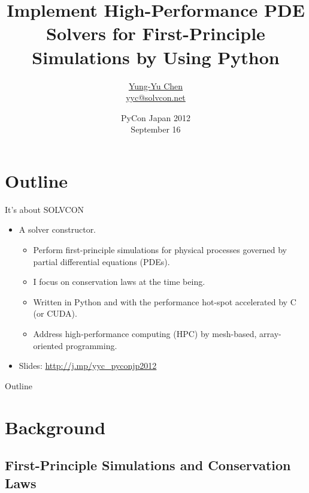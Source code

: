 \documentclass[dvips,xcolor=pst,14pt]{beamer}
\title[SOLVCON: HPC PDE Solvers]{Implement High-Performance PDE Solvers for
First-Principle Simulations by Using Python}
\author[\href{http://solvcon.net/yyc/}{Chen}]%
{\href{http://solvcon.net/yyc/}{Yung-Yu Chen} \\ \url{yyc@solvcon.net}}
\institute[\href{http://solvcon.net/}{SOLVCON}]%
{Developer \\ \href{http://solvcon.net/}{SOLVCON Project}}
\date[2012/9/16]{PyCon Japan 2012 \\ September 16}
\begin{document}
\begin{frame}
\titlepage
\end{frame}

\section*{
Outline
}

\begin{frame}{
%
It's about SOLVCON
%
}
\begin{itemize}
  \item A solver constructor.
  \begin{itemize}
    \item Perform first-principle simulations for physical processes governed
    by partial differential equations (PDEs).
    \item I focus on conservation laws at the time being.
    \item Written in \alert{Python} and with the performance hot-spot
    accelerated by C (or CUDA).
    \item Address \alert{high-performance computing (HPC)} by mesh-based,
    array-oriented programming.
  \end{itemize}
  \item Slides: \url{http://j.mp/yyc_pyconjp2012}
\end{itemize}
\end{frame}

\begin{frame}{
%
Outline
%
}
\tableofcontents
\end{frame}

\section{
Background
}

\subsection{
First-Principle Simulations and Conservation Laws
}
\end{document}

